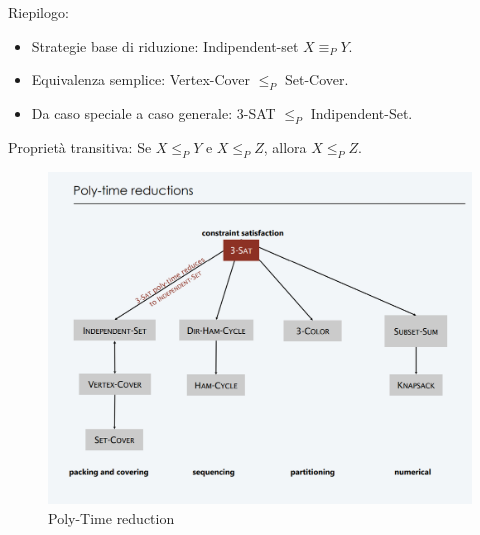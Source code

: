 \documentclass{article}
\begin{document}
\noindent Riepilogo:
\begin{itemize}
    \item Strategie base di riduzione: Indipendent-set $X \equiv_P Y$.
    \item Equivalenza semplice: Vertex-Cover $\leq_P$ Set-Cover.
    \item Da caso speciale a caso generale: 3-SAT $\leq_P$ Indipendent-Set.
\end{itemize}
Proprietà transitiva: Se $X\leq_PY$ e $X \leq_P Z$, allora $X\leq_PZ$.
\begin{figure}[H]
    \centering
    \includegraphics[width=0.5\linewidth]{Screenshot 2024-05-31 190613.png}
    \caption{Poly-Time reduction}
    \label{fig:enter-label}
\end{figure}
\newpage
\end{document}
